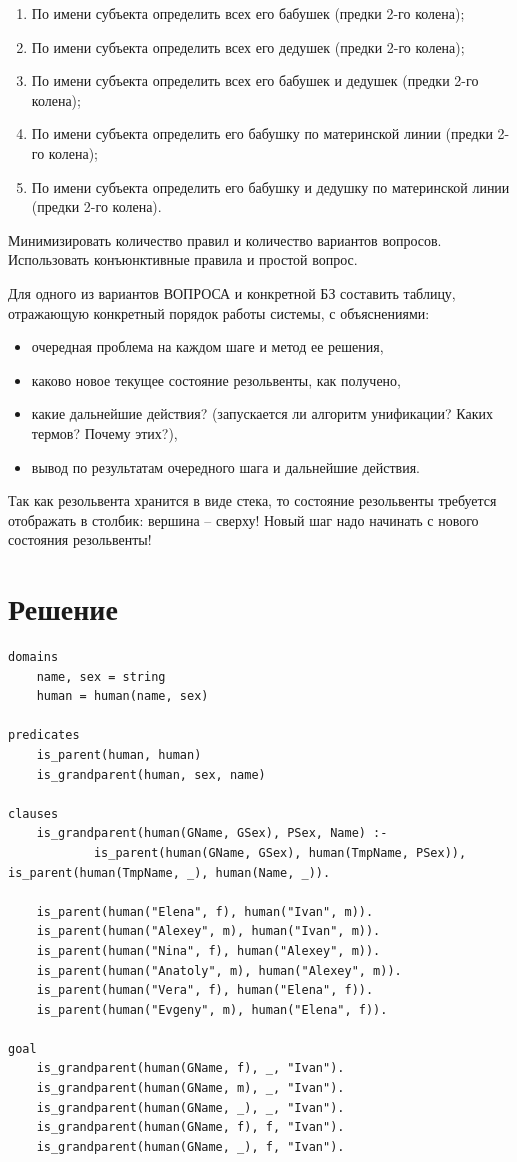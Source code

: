 \documentclass[12pt]{report}
\begin{document}
\begin{enumerate}
	\item По имени субъекта определить всех его бабушек (предки 2-го колена);
	\item По имени субъекта определить всех его дедушек (предки 2-го колена);
	\item По имени субъекта определить всех его бабушек и дедушек (предки 2-го колена);
	\item По имени субъекта определить его бабушку по материнской линии (предки 2-го колена);
	\item По имени субъекта определить его бабушку и дедушку по материнской линии (предки 2-го колена).
\end{enumerate}

Минимизировать количество правил и количество вариантов вопросов. Использовать конъюнктивные правила и простой вопрос.

Для одного из вариантов ВОПРОСА и конкретной БЗ составить таблицу, отражающую конкретный порядок работы системы, с объяснениями:

\begin{itemize}
	\item очередная проблема на каждом шаге и метод ее решения,
	\item каково новое текущее состояние резольвенты, как получено,
	\item какие дальнейшие действия? (запускается ли алгоритм унификации? Каких термов? Почему этих?),
	\item вывод по результатам очередного шага и дальнейшие действия.
\end{itemize}

Так как резольвента хранится в виде стека, то состояние резольвенты требуется отображать в столбик: вершина – сверху! Новый шаг надо начинать с нового состояния резольвенты!

\newpage
\section*{Решение}

\begin{lstlisting}
domains
	name, sex = string
	human = human(name, sex)

predicates
	is_parent(human, human)
	is_grandparent(human, sex, name)

clauses
	is_grandparent(human(GName, GSex), PSex, Name) :- 
			is_parent(human(GName, GSex), human(TmpName, PSex)), is_parent(human(TmpName, _), human(Name, _)).
	
	is_parent(human("Elena", f), human("Ivan", m)).
	is_parent(human("Alexey", m), human("Ivan", m)).
	is_parent(human("Nina", f), human("Alexey", m)).
	is_parent(human("Anatoly", m), human("Alexey", m)).
	is_parent(human("Vera", f), human("Elena", f)).
	is_parent(human("Evgeny", m), human("Elena", f)).

goal
	is_grandparent(human(GName, f), _, "Ivan").
	is_grandparent(human(GName, m), _, "Ivan").
	is_grandparent(human(GName, _), _, "Ivan").
	is_grandparent(human(GName, f), f, "Ivan").
	is_grandparent(human(GName, _), f, "Ivan").
\end{lstlisting}
\end{document}

